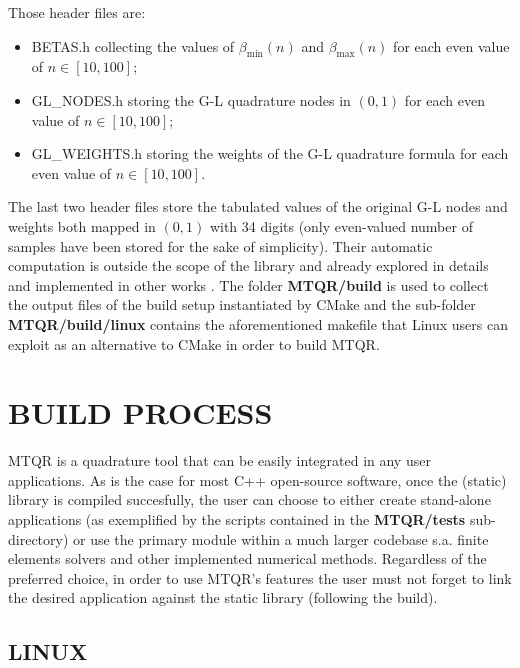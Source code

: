 \documentclass[a4paper, twosided]{book}
\begin{document}
\noindent 
 Those header files are:
\begin{itemize}
    \item \colorbox{poliGrayBlue}{BETAS.h} collecting the values of $\beta_{\text{min}}(n)$ and $\beta_{\text{max}}(n)$ for each even value of $n\in[10,100]$;
    \item \colorbox{poliGrayBlue}{GL\_NODES.h} storing the G-L quadrature nodes in $(0,1)$ for each even value of $n\in[10,100]$;
    \item \colorbox{poliGrayBlue}{GL\_WEIGHTS.h} storing the weights of the G-L quadrature formula for each even value of $n\in[10,100]$.
\end{itemize}
The last two header files store the tabulated values of the original G-L nodes and weights both mapped in $(0,1)$ with 34 digits (only even-valued number of samples have been stored for the sake of simplicity). Their automatic computation is outside the scope of the library and already explored in details and implemented in other works \cite{Gautschi94,Hale13}. The folder \colorbox{poliGrayBlue}{\textbf{MTQR/build}} is used to collect the output files of the build setup instantiated by CMake and the sub-folder \colorbox{poliGrayBlue}{\textbf{MTQR/build/linux}} contains the aforementioned \colorbox{poliGrayBlue}{makefile} that Linux users can exploit as an alternative to CMake in order to build MTQR.

\section[Build process]{\changefont BUILD PROCESS}\label{Sec2.3}

\noindent
MTQR is a quadrature tool that can be easily integrated in any user applications. As is the case for most C++ open-source software, once the (static) library is compiled succesfully, the user can choose to either create stand-alone applications (as exemplified by the scripts contained in the \colorbox{poliGrayBlue}{\textbf{MTQR/tests}} sub-directory) or use the primary module within a much larger codebase s.a. finite elements solvers and other implemented numerical methods. Regardless of the preferred choice, in order to use MTQR's features the user must not forget to link the desired application against the static library (following the build).

\subsection[Linux]{\changefont LINUX}\label{SubSec2.3.1}
\end{document}
